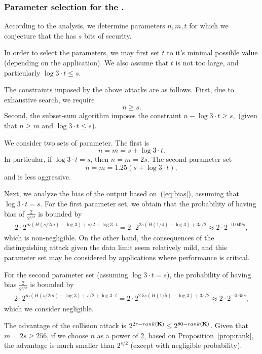 \subsubsection{Parameter selection for the \ttwPRF.}
According to the analysis, we determine parameters $n,m,t$ for which
we conjecture that the \ttwPRF has $s$ bits of security.

In order to select the parameters, we may first set $t$ to it's minimal possible value
(depending on the application).
We also assume that $t$ is not too large, and particularly $\log 3 \cdot t \leq s$.

The constraints imposed by the above attacks are as follows.
First, due to exhaustive search, we require $$n \geq s.$$
Second, the subset-sum algorithm
imposes the constraint
$n - \log 3 \cdot t \geq s,$
(given that $n \geq m$ and $\log 3 \cdot t \leq s$).


We consider two sets of parameter.
The first is
$$n = m = s + \log 3 \cdot t.$$
In particular, if $\log 3 \cdot t  = s$, then
$n = m = 2s$.
The second parameter set
$$n = m = 1.25(s + \log 3 \cdot t),$$
and is less aggressive.

Next, we analyze the bias of the output based on~(\ref{eq:bias}),
assuming that $\log 3 \cdot t = s$.
For the first parameter set,
we obtain that the probability of having bias of $\tfrac{2}{2^{s/2}}$ is bounded by
\begin{align*}
2 \cdot 2^{m (H(s/2m) - \log 3) + s/2 + \log 3 \cdot t} =
2 \cdot 2^{2s (H(1/4) - \log 3) + 3s/2} \approx
2 \cdot 2^{-0.049s},
\end{align*}
which is non-negligible.
On the other hand, the consequences of the distinguishing attack given the data limit
seem relatively mild, and this parameter set may be considered by applications
where performance is critical.

For the second parameter set (assuming $\log 3 \cdot t = s$),
the probability of having bias $\tfrac{2}{2^{s/2}}$ is bounded by
\begin{align*}
2 \cdot 2^{m (H(s/2m) - \log 3) + s/2 + \log 3 \cdot t} =
2 \cdot 2^{2.5s (H(1/5) - \log 3) + 3s/2} \approx
2 \cdot 2^{-0.65s},
\end{align*}
which we consider negligible.

The advantage of the collision attack is $2^{2r - rank(\mat{K})} \leq 2^{80 - rank(\mat{K})}$.
Given that $m = 2s \geq 256$, if we choose $n$ as a power of 2,
based on Proposition~\ref{prop:rank},
the advantage is much smaller than $2^{s/2}$ (except with negligible probability).

